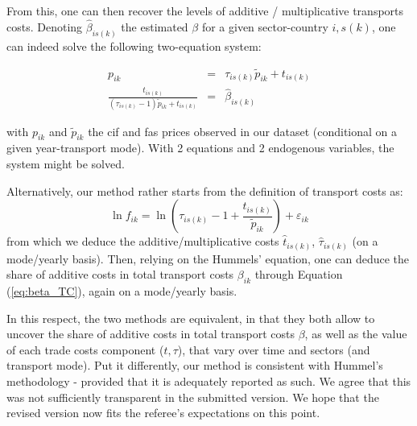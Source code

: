 \documentclass[a4paper,12pt]{article}
\begin{document}
\begin{itemize}
     From this, one can then recover the levels of additive / multiplicative transports costs. Denoting $\widehat{\beta}_{is(k)}$ the estimated $\beta$ for a given sector-country $i,s(k)$, one can indeed solve the following two-equation system:

\begin{eqnarray}
p_{ik} &=& \tau_{is(k)}\widetilde{p}_{ik} +t_{is(k)} \label{eq:system1}\\
\frac{t_{is(k)}}{(\tau_{is(k)}-1)\widetilde{p}_{ik}+ t_{is(k)}} &=& \widehat{\beta}_{is(k)}  \label{eq:system2}
\end{eqnarray}

\noindent with $p_{ik}$ and $\widetilde{p}_{ik}$ the cif and fas prices observed in our dataset (conditional on a given year-transport mode). With 2 equations and 2 endogenous variables, the system might be solved.

     Alternatively, our method rather starts from the definition of transport costs as:
     $$\ln f_{ik} = \ln\left(\tau_{is(k)} -1 + \frac{t_{is(k)}}{\widetilde{p}_{ik}}\right) +\varepsilon_{ik}$$
from which we deduce the additive/multiplicative costs $\widehat{t}_{is(k)}$, $\widehat{\tau}_{is(k)}$ (on a mode/yearly basis). Then, relying on the Hummels' equation, one can deduce the share of additive costs in total transport costs $\beta_{ik}$ through Equation (\ref{eq:beta_TC}), again on a mode/yearly basis.

In this respect, the two methods are equivalent, in that they both allow to uncover the share of additive costs in total transport costs $\beta$, as well as the value of each trade costs component ($t,\tau$), that vary over time and sectors (and transport mode). Put it differently, our method is consistent with Hummel's methodology - provided that it is adequately reported as such. We agree that this was not sufficiently transparent in the submitted version. We hope that the revised version now fits the referee's expectations on this point.

\end{itemize}
\end{document}
